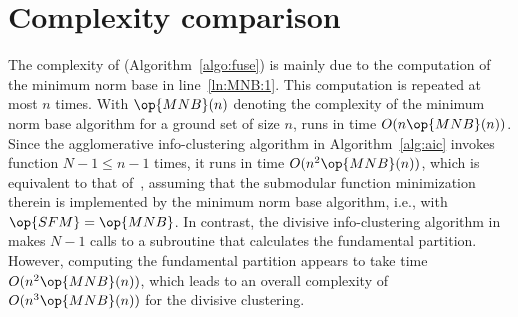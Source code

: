 \section{Complexity comparison}
\label{sec:complexity}
The complexity of \Agglomerate (Algorithm~\ref{algo:fuse}) is mainly due to the computation of the
minimum norm base in line~\ref{ln:MNB:1}.  This computation is repeated at most $n$ times.  With
$\op{MNB}(n)$ denoting the complexity of the minimum norm base algorithm for a ground set of size $n$,
\Agglomerate runs in time $O(n\op{MNB}(n))$. Since the agglomerative info-clustering algorithm in
Algorithm~\ref{alg:aic} invokes function \Agglomerate $N-1\leq n-1$ times, it runs in time $O(n^2
\op{MNB}(n))$, which is equivalent to that of~\cite[Algorithm~3]{chan16cluster}, assuming that the
submodular function minimization therein is implemented by the minimum norm base algorithm, i.e.,
with $\op{SFM}=\op{MNB}$. In contrast, the divisive info-clustering algorithm
in~\cite[Algorithm~2]{chan16cluster} makes $N-1$ calls to a subroutine that calculates the
fundamental partition. However, computing the fundamental partition appears to take time $O(n^2
\op{MNB}(n))$, which leads to an overall complexity of $O(n^3 \op{MNB}(n))$ for the divisive
clustering.


